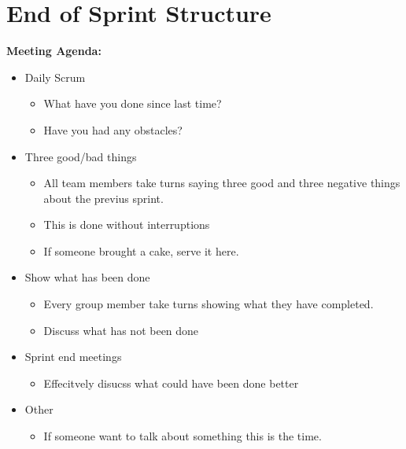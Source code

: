 \chapter{End of Sprint Structure}\label{appendix:endOfSprint}

\begin{framed}
\textbf{Meeting Agenda: }
\begin{itemize}
    \item Daily Scrum
    \begin{itemize}
        \item What have you done since last time?
        \item Have you had any obstacles? 
    \end{itemize}

    \item Three good/bad things
    \begin{itemize}
        \item All team members take turns saying three good and three negative things
        about the previus sprint. 
        \item This is done without interruptions
        \item If someone brought a cake, serve it here.
    \end{itemize}

    \item Show what has been done
    \begin{itemize}
        \item Every group member take turns showing what they have completed. 
        \item Discuss what has not been done
    \end{itemize}
        
    \item Sprint end meetings
    \begin{itemize}
        \item Effecitvely disucss what could have been done better
    \end{itemize}

    \item Other
    \begin{itemize}
        \item If someone want to talk about something this is the time.
    \end{itemize}


\end{itemize}
\end{framed}
